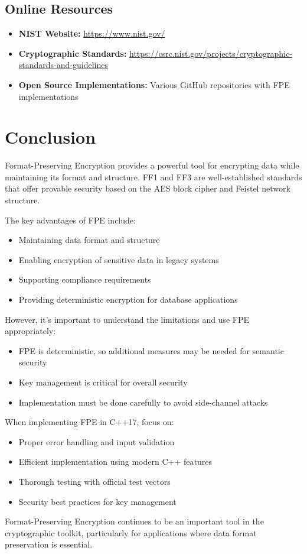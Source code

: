 \documentclass[11pt,a4paper]{article}
\begin{document}
\subsection{Online Resources}

\begin{itemize}
    \item \textbf{NIST Website:} \url{https://www.nist.gov/}
    \item \textbf{Cryptographic Standards:} \url{https://csrc.nist.gov/projects/cryptographic-standards-and-guidelines}
    \item \textbf{Open Source Implementations:} Various GitHub repositories with FPE implementations
\end{itemize}

\section{Conclusion}

Format-Preserving Encryption provides a powerful tool for encrypting data while maintaining its format and structure. FF1 and FF3 are well-established standards that offer provable security based on the AES block cipher and Feistel network structure.

The key advantages of FPE include:
\begin{itemize}
    \item Maintaining data format and structure
    \item Enabling encryption of sensitive data in legacy systems
    \item Supporting compliance requirements
    \item Providing deterministic encryption for database applications
\end{itemize}

However, it's important to understand the limitations and use FPE appropriately:
\begin{itemize}
    \item FPE is deterministic, so additional measures may be needed for semantic security
    \item Key management is critical for overall security
    \item Implementation must be done carefully to avoid side-channel attacks
\end{itemize}

When implementing FPE in C++17, focus on:
\begin{itemize}
    \item Proper error handling and input validation
    \item Efficient implementation using modern C++ features
    \item Thorough testing with official test vectors
    \item Security best practices for key management
\end{itemize}

Format-Preserving Encryption continues to be an important tool in the cryptographic toolkit, particularly for applications where data format preservation is essential.
\end{document}

